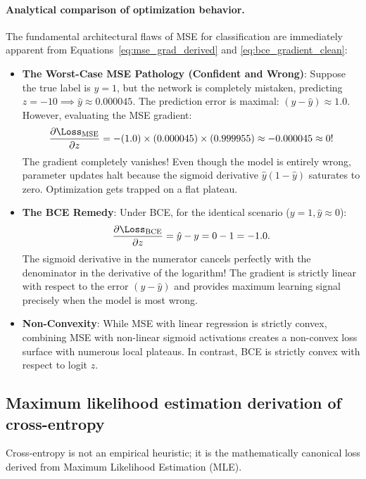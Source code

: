 \documentclass[../../main.tex]{subfiles}
\begin{document}
\paragraph{Analytical comparison of optimization behavior.}
The fundamental architectural flaws of MSE for classification are immediately apparent from Equations~\eqref{eq:mse_grad_derived} and \eqref{eq:bce_gradient_clean}:
\begin{itemize}
    \item \textbf{The Worst-Case MSE Pathology (Confident and Wrong)}:
    Suppose the true label is $y = 1$, but the network is completely mistaken, predicting $z = -10 \implies \hat{y} \approx 0.000045$.
    The prediction error is maximal: $(y - \hat{y}) \approx 1.0$. However, evaluating the MSE gradient:
    \[
    \frac{\partial \Loss_{\text{MSE}}}{\partial z} = -(1.0) \times (0.000045) \times (0.999955) \approx -0.000045 \approx 0!
    \]
    The gradient completely vanishes! Even though the model is entirely wrong, parameter updates halt because the sigmoid derivative $\hat{y}(1 - \hat{y})$ saturates to zero. Optimization gets trapped on a flat plateau.
    \item \textbf{The BCE Remedy}:
    Under BCE, for the identical scenario ($y = 1, \hat{y} \approx 0$):
    \[
    \frac{\partial \Loss_{\text{BCE}}}{\partial z} = \hat{y} - y = 0 - 1 = -1.0.
    \]
    The sigmoid derivative in the numerator cancels perfectly with the denominator in the derivative of the logarithm! The gradient is strictly linear with respect to the error $(y - \hat{y})$ and provides maximum learning signal precisely when the model is most wrong.
    \item \textbf{Non-Convexity}: While MSE with linear regression is strictly convex, combining MSE with non-linear sigmoid activations creates a non-convex loss surface with numerous local plateaus. In contrast, BCE is strictly convex with respect to logit $z$.
\end{itemize}

\subsection{Maximum likelihood estimation derivation of cross-entropy}
Cross-entropy is not an empirical heuristic; it is the mathematically canonical loss derived from Maximum Likelihood Estimation (MLE).
\end{document}
